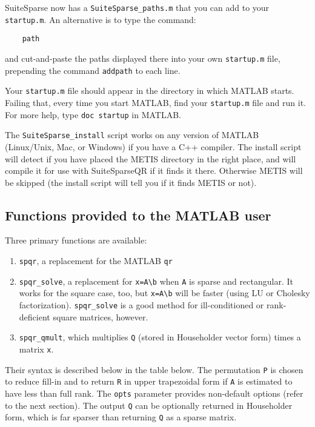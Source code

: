 \documentclass[12pt]{article}
\begin{document}
SuiteSparse now has a \verb'SuiteSparse_paths.m' that you can add to
your \verb'startup.m'.
An alternative is to type the command:
\begin{verbatim}
    path
\end{verbatim}
and cut-and-paste the paths displayed there into your own \verb'startup.m'
file, prepending the command \verb'addpath' to each line.

Your \verb'startup.m' file should appear in the directory in which MATLAB
starts.  Failing that, every time you start MATLAB, find your \verb'startup.m'
file and run it.  For more help, type \verb'doc startup' in MATLAB.

The \verb'SuiteSparse_install' script works on any version of MATLAB
(Linux/Unix, Mac, or Windows) if you have a C++ compiler.  The install script
will detect if you have placed the METIS directory in the right place, and will
compile it for use with SuiteSparseQR if it finds it there.  Otherwise METIS
will be skipped (the install script will tell you if it finds METIS or not).

\subsection{Functions provided to the MATLAB user}

Three primary functions are available:

\begin{enumerate}

\item \verb'spqr', a replacement for the MATLAB \verb'qr'

\item \verb'spqr_solve', a replacement for \verb'x=A\b' when \verb'A' is sparse
and rectangular.  It works for the square case, too, but \verb'x=A\b' will be
faster (using LU or Cholesky factorization). \verb'spqr_solve' is a good method
for ill-conditioned or rank-deficient square matrices, however.

\item \verb'spqr_qmult', which multiplies \verb'Q' (stored in Householder
vector form) times a matrix \verb'x'.

\end{enumerate}

Their syntax is described below in the table below.
The permutation \verb'P' is chosen to reduce fill-in and to return \verb'R' in
upper trapezoidal form if \verb'A' is estimated to have less than full rank.
The \verb'opts' parameter provides non-default options (refer to the next
section).  The output \verb'Q' can be optionally returned in Householder form,
which is far sparser than returning \verb'Q' as a sparse matrix.
\end{document}
